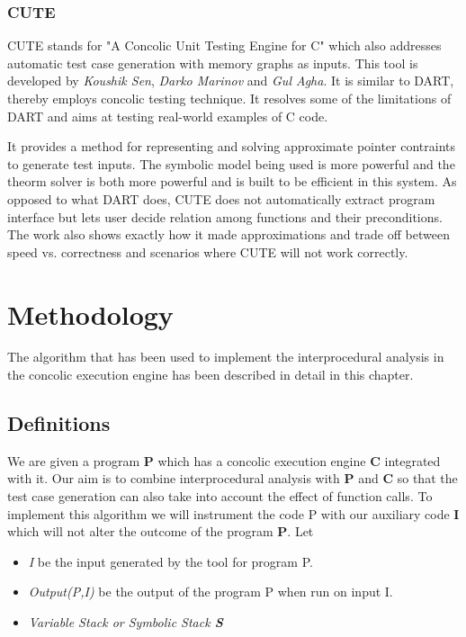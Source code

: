 \documentclass[12pt,oneside]{book}
\begin{document}
\newpage


\subsection{CUTE}
CUTE stands for "A Concolic Unit Testing Engine for C" which also addresses automatic test case generation with memory graphs as inputs. This tool is developed by \textit{Koushik Sen}, \textit{Darko Marinov} and \textit{Gul Agha}. It is similar to DART, thereby employs concolic testing technique. It resolves some of the limitations of DART and aims at testing real-world examples of C code.

It provides a method for representing and solving approximate pointer contraints to generate test inputs. The symbolic model being used is more powerful and the theorm solver is both more powerful and is built to be efficient in this system. As opposed to what DART does, CUTE does not automatically extract program interface but lets user decide relation among functions and their preconditions. The work also shows exactly how it made approximations and trade off between speed vs. correctness and scenarios where CUTE will not work correctly.






\newpage


\chapter{Methodology}
The algorithm that has been used to implement the interprocedural analysis in the concolic execution engine has been described in detail in this chapter.

\section{Definitions}

We are given a program \textbf{P} which has a concolic execution engine \textbf{C} integrated with it. Our aim is to combine interprocedural analysis with \textbf{P} and \textbf{C} so that the test case generation can also take into account the effect of function calls. To implement this algorithm we will instrument the code P with our auxiliary code \textbf{I} which will not alter the outcome of the program \textbf{P}. Let 

\begin{itemize}
 \item \textit{I} be the input generated by the tool for program P.
 \item \textit{Output(P,I)} be the output of the program P when run on input I. 
 \item \textit{Variable Stack or Symbolic Stack \textbf{S}}  
\end{itemize}
\end{document}
